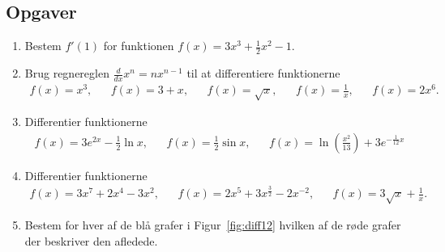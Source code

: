 \subsection{Opgaver}

\begin{enumerate}
	\item Bestem $f'(1)$ for funktionen $f(x)=3x^3+\frac{1}{2}x^2-1$.

	\item Brug regnereglen $\frac{d}{dx} x^n=nx^{n-1}$ til at differentiere funktionerne
	\begin{align*}
	f(x)=x^3,&& f(x)=3+x,&& f(x)=\sqrt{x},&& f(x)=\frac{1}{x},&& f(x)=2x^6.
	\end{align*}
	
	\item Differentier funktionerne 
	\begin{align*}
	f(x)=3e^{2x}-\frac{1}{2}\ln x,&& f(x)=\frac{1}{2}\sin x,&& f(x)=\ln(\frac{x^2}{13})+3e^{-\frac{1}{12}x}
	\end{align*}
	
	\item Differentier funktionerne
	\begin{align*}
	f(x)=3x^7+2x^4-3x^2,&&f(x)=2x^5+3x^{\frac{3}{2}}-2x^{-2},&&f(x)=3\sqrt{x}+\frac{1}{x}.
	\end{align*}
	
		
	\item \label{it:diff12} Bestem for hver af de blå grafer i Figur~\ref{fig:diff12} hvilken af de røde grafer der beskriver den afledede.
	\begin{figure}
		\centering
		

\end{figure}
\end{enumerate}

